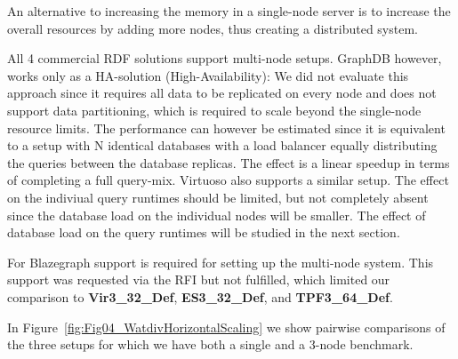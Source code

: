 An alternative to increasing the memory in a single-node server is to increase the overall resources by 
adding more nodes, thus creating a distributed system. 

All 4 commercial RDF solutions support multi-node setups. GraphDB however, works only as a HA-solution (High-Availability): We did not evaluate this approach since 
it requires all data to be replicated on every node and does not support data partitioning, which is required to scale beyond the single-node resource limits.
The performance can however be estimated since it is equivalent to a setup with N identical databases with a load balancer equally distributing the queries between
the database replicas. The effect is a linear speedup in terms of completing a full query-mix. 
Virtuoso also supports a similar setup.
The effect on the indiviual query runtimes should be limited, but not
completely absent since the database load on the individual nodes will be smaller. The effect of database load on the query runtimes will be studied in the next section.


For Blazegraph support is required for setting up the multi-node system. This support was requested via the RFI but not fulfilled, which limited our comparison to \textbf{Vir3\_32\_Def}, \textbf{ES3\_32\_Def}, and \textbf{TPF3\_64\_Def}.

In Figure~\ref{fig:Fig04_WatdivHorizontalScaling} we show pairwise comparisons of the three setups for which we have both a single and a 3-node benchmark. 

